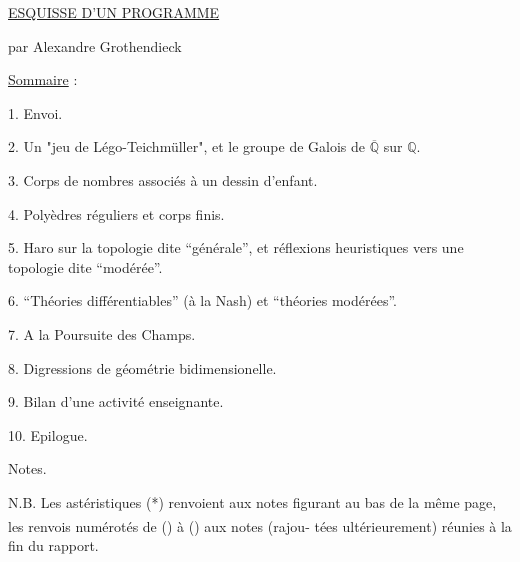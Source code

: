 \uline{ESQUISSE D'UN PROGRAMME}

par Alexandre Grothendieck

\uline{Sommaire} :

1. Envoi.

2. Un "jeu de Légo-Teichmüller", et le groupe de Galois de $\overline{\mathbb{Q}}$ sur $\mathbb{Q}$.

3. Corps de nombres associés à un dessin d'enfant.

4. Polyèdres réguliers et corps finis.

5. Haro sur la topologie dite ``générale'', et réflexions heuristiques
vers une topologie dite ``modérée''.

6. ``Théories différentiables'' (à la Nash) et ``théories modérées''.

7. A la Poursuite des Champs.

8. Digressions de géométrie bidimensionelle.

9. Bilan d'une activité enseignante.

10. Epilogue.

Notes.

N.B. Les astéristiques (*) renvoient aux notes figurant au bas de
la même page, les renvois numérotés de (\textsuperscript{}) à (\textsuperscript{}) aux notes (rajou-%
tées ultérieurement) réunies à la fin du rapport.


